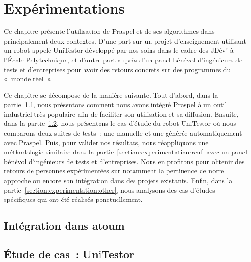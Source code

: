 \chapter{Expérimentations}
\label{chapter:experimentations}

\minitoc


Ce chapitre présente l'utilisation de Praspel et de ses algorithmes dans
principalement deux contextes. D'une part sur un projet d'enseignement utilisant
un robot appelé UniTestor développé par nos soins dans le cadre des JDév' à
l'École Polytechnique, et d'autre part auprès d'un panel bénévol d'ingénieurs de
tests et d'entreprises pour avoir des retours concrets sur des programmes du
«~monde réel~».

Ce chapitre se décompose de la manière suivante. Tout d'abord, dans la
partie~\ref{section:experimentation:atoum}, nous présentons comment nous avons
intégré Praspel à un outil industriel très populaire afin de faciliter son
utilisation et sa diffusion. Ensuite, dans la
partie~\ref{section:experimentation:unitestor}, nous présentons le cas d'étude
du robot UniTestor où nous comparons deux suites de tests~: une manuelle et une
générée automatiquement avec Praspel.  Puis, pour valider nos résultats, nous
réappliquons une méthodologie similaire dans la
partie~\ref{section:experimentation:real} avec un panel bénévol d'ingénieurs de
tests et d'entreprises. Nous en profitons pour obtenir des retours de personnes
expérimentées sur notamment la pertinence de notre approche ou encore son
intégration dans des projets existants. Enfin, dans la
partie~\ref{section:experimentation:other}, nous analysons des cas d'études
spécifiques qui ont été réalisés ponctuellement.

\section{Intégration dans atoum}
\label{section:experimentation:atoum}

\section{Étude de cas~: UniTestor}
\label{section:experimentation:unitestor}

